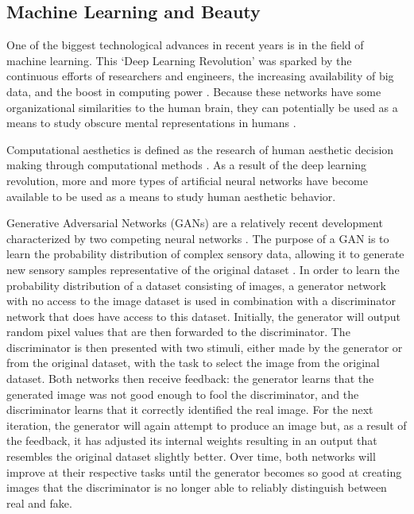 \documentclass[../main.tex]{subfiles}
\begin{document}
\subsection{Machine Learning and Beauty}
One of the biggest technological advances in recent years is in the field of machine learning. This `Deep Learning Revolution' was sparked by the continuous efforts of researchers and engineers, the increasing availability of big data, and the boost in computing power \parencite{sejnowskiDeepLearningRevolution2018}. Because these networks have some organizational similarities to the human brain, they can potentially be used as a means to study obscure mental representations in humans \parencite{guoDeepLearningVisual2016, goetschalckx2021generative}. 

Computational aesthetics is defined as the research of human aesthetic decision making through computational methods \parencite{valenziseAdvancesChallengesComputational2022, hoenig2005proceedings}. As a result of the deep learning revolution, more and more types of artificial neural networks have become available to be used as a means to study human aesthetic behavior.

Generative Adversarial Networks (GANs) are a relatively recent development characterized by two competing neural networks \parencite{goodfellow2014generative}. The purpose of a GAN is to learn the probability distribution of complex sensory data, allowing it to generate new sensory samples representative of the original dataset \parencite{goetschalckx2021generative}. In order to learn the probability distribution of a dataset consisting of images, a generator network with no access to the image dataset is used in combination with a discriminator network that does have access to this dataset. Initially, the generator will output random pixel values that are then forwarded to the discriminator. The discriminator is then presented with two stimuli, either made by the generator or from the original dataset, with the task to select the image from the original dataset. Both networks then receive feedback: the generator learns that the generated image was not good enough to fool the discriminator, and the discriminator learns that it correctly identified the real image. For the next iteration, the generator will again attempt to produce an image but, as a result of the feedback, it has adjusted its internal weights resulting in an output that resembles the original dataset slightly better. Over time, both networks will improve at their respective tasks until the generator becomes so good at creating images that the discriminator is no longer able to reliably distinguish between real and fake.
\end{document}
